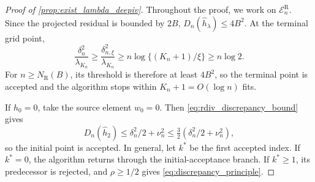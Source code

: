 \begin{proof}[Proof of \cref{prop:exist_lambda_deepiv}]
Throughout the proof, we work on $\mathcal E_n^{\mathrm R}$. Since the projected residual is bounded by $2B$,
$D_n(\hat h_\lambda)\leqslant4B^2$. At the terminal grid point,
\[
\frac{\delta_n^2}{\lambda_{K_n}}
\geqslant\frac{\delta_{n,\xi}^2}{\lambda_{K_n}}
\geqslant n\log\{(K_n+1)/\xi\}
\geqslant n\log2.
\]
For $n\geqslant N_{\mathrm R}(B)$, its threshold is therefore at least $4B^2$, so the terminal point is accepted and the algorithm stops within $K_n+1=O(\log n)$ fits.

If $h_0=0$, take the source element $w_0=0$. Then \eqref{eq:rdiv_discrepancy_bound} gives
\[
D_n(\hat h_2)\leqslant\delta_n^2/2+\nu_n^2 \leqslant \tfrac32(\delta_n^2/2+\nu_n^2),
\]
so the initial point is accepted. In general, let $k^*$ be the first accepted index. If $k^*=0$, the algorithm returns through the initial-acceptance branch. If $k^*\geqslant1$, its predecessor is rejected, and $\rho\geqslant1/2$ gives \eqref{eq:discrepancy_principle}.
\end{proof}

